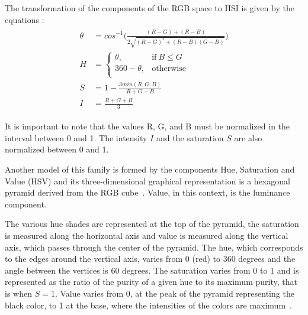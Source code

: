 The transformation of the components of the RGB space to HSI is given by the equations \citep{pedrini:08}:
\begin{align}
\label{eq:rgb_para_hsi}
\begin{split}
  \theta &= cos^{-1} \bigg( \frac{(R - G) + (R - B)}{2 \sqrt{(R - G)^2 + (R - B)(G - B)}} \bigg)
  \\[0.5em]
  H &= \begin{cases}
            \theta,       & \text{if}\ B \leq G\\
            360 - \theta, & \text{otherwise}\\
       \end{cases}
  \\[0.5em]
  S &= 1 - \frac{3 min(R, G, B)}{R + G + B}
  \\[0.5em]
  I &= \frac{R + G + B}{3}
\end{split}
\end{align}

It is important to note that the values R, G, and B must be normalized in the interval between 0 and 1. The intensity $I$ and the saturation $S$ are also normalized between 0 and 1.

Another model of this family is formed by the components Hue, Saturation and Value (HSV) and its three-dimensional graphical representation is a hexagonal pyramid derived from the RGB cube~\citep{pedrini:08}. Value, in this context, is the luminance component.

The various hue shades are represented at the top of the pyramid, the saturation is measured along the horizontal axis and value is measured along the vertical axis, which passes through the center of the pyramid. The hue, which corresponds to the edges around the vertical axis, varies from 0 (red) to 360 degrees and the angle between the vertices is 60 degrees. The saturation varies from 0 to 1 and is represented as the ratio of the purity of a given hue to its maximum purity, that is when $S = 1$. Value varies from 0, at the peak of the pyramid representing the black color, to 1 at the base, where the intensities of the colors are maximum~\citep{pedrini:08}.

